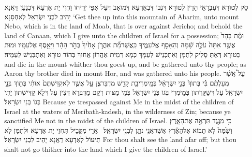 {סַק לְטוּרָא דְּעִבְרָאֵי הָדֵין לְטוּרָא דִּנְבוֹ דִּבְאַרְעָא דְּמוֹאָב דְּעַל אַפֵּי יְרֵיחוֹ וַחְזִי יָת אַרְעָא דִּכְנַעַן דַּאֲנָא יָהֵיב לִבְנֵי יִשְׂרָאֵל לְאַחְסָנָא׃}
{‘Get thee up into this mountain of Abarim, unto mount Nebo, which is in the land of Moab, that is over against Jericho; and behold the land of Canaan, which I give unto the children of Israel for a possession;}{}
{וּמֻ֗ת בָּהָר֙ אֲשֶׁ֤ר אַתָּה֙ עֹלֶ֣ה שָׁ֔מָּה וְהֵאָסֵ֖ף אֶל\maqqaf עַמֶּ֑יךָ כַּֽאֲשֶׁר\maqqaf מֵ֞ת אַהֲרֹ֤ן אָחִ֙יךָ֙ בְּהֹ֣ר הָהָ֔ר וַיֵּאָ֖סֶף אֶל\maqqaf עַמָּֽיו׃}
{וּמוּת בְּטוּרָא דְּאַתְּ סָלֵיק לְתַמָּן וְאִתְכְּנֵישׁ לְעַמָּךְ כְּמָא דְּמִית אַהֲרוֹן אֲחוּךְ בְּהוֹר טוּרָא וְאִתְכְּנֵישׁ לְעַמֵּיהּ׃}
{and die in the mount whither thou goest up, and be gathered unto thy people; as Aaron thy brother died in mount Hor, and was gathered unto his people.}{}
{עַל֩ אֲשֶׁ֨ר מְעַלְתֶּ֜ם בִּ֗י בְּתוֹךְ֙ בְּנֵ֣י יִשְׂרָאֵ֔ל בְּמֵֽי\maqqaf מְרִיבַ֥ת קָדֵ֖שׁ מִדְבַּר\maqqaf צִ֑ן עַ֣ל אֲשֶׁ֤ר לֹֽא\maqqaf קִדַּשְׁתֶּם֙ אוֹתִ֔י בְּת֖וֹךְ בְּנֵ֥י יִשְׂרָאֵֽל׃}
{עַל דְּשַׁקַּרְתּוּן בְּמֵימְרִי בְּגוֹ בְּנֵי יִשְׂרָאֵל בְּמֵי מַצּוּת רְקַם מַדְבְּרָא דְּצִין עַל דְּלָא קַדִּישְׁתּוּן יָתִי בְּגוֹ בְּנֵי יִשְׂרָאֵל׃}
{Because ye trespassed against Me in the midst of the children of Israel at the waters of Meribath-kadesh, in the wilderness of Zin; because ye sanctified Me not in the midst of the children of Israel.}{}
{כִּ֥י מִנֶּ֖גֶד תִּרְאֶ֣ה אֶת\maqqaf הָאָ֑רֶץ וְשָׁ֙מָּה֙ לֹ֣א תָב֔וֹא אֶל\maqqaf הָאָ֕רֶץ אֲשֶׁר\maqqaf אֲנִ֥י נֹתֵ֖ן לִבְנֵ֥י יִשְׂרָאֵֽל׃ \petucha }
{אֲרֵי מִקֳּבֵיל תִּחְזֵי יָת אַרְעָא וּלְתַמָּן לָא תֵיעוֹל לְאַרְעָא דַּאֲנָא יָהֵיב לִבְנֵי יִשְׂרָאֵל׃}
{For thou shalt see the land afar off; but thou shalt not go thither into the land which I give the children of Israel.’}{}
